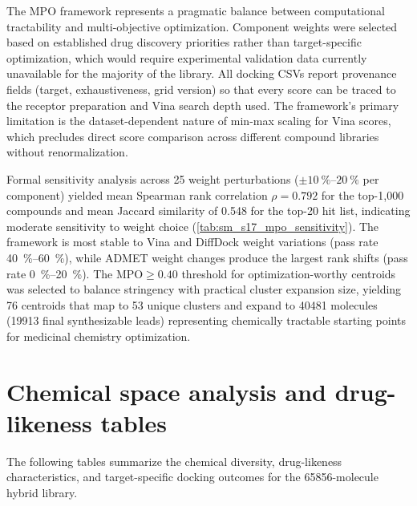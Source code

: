\documentclass[journal=jcisd8,manuscript=suppinfo]{achemso}
\begin{document}
The MPO framework represents a pragmatic balance between computational tractability and multi-objective optimization. Component weights were selected based on established drug discovery priorities \cite{Hughes2008, Lipinski2004} rather than target-specific optimization, which would require experimental validation data currently unavailable for the majority of the library. All docking CSVs report provenance fields (target, exhaustiveness, grid version) so that every score can be traced to the receptor preparation and Vina search depth used. The framework's primary limitation is the dataset-dependent nature of min-max scaling for Vina scores, which precludes direct score comparison across different compound libraries without renormalization.

Formal sensitivity analysis across \num{25} weight perturbations ($\pm \qtyrange{10}{20}{\percent}$ per component) yielded mean Spearman rank correlation $\rho = \num{0.792}$ for the top-1,000 compounds and mean Jaccard similarity of \num{0.548} for the top-20 hit list, indicating moderate sensitivity to weight choice (\cref{tab:sm_s17_mpo_sensitivity}). The framework is most stable to Vina and DiffDock weight variations (pass rate \qtyrange{40}{60}{\percent}), while ADMET weight changes produce the largest rank shifts (pass rate \qtyrange{0}{20}{\percent}). The $\text{MPO} \geq \num{0.40}$ threshold for optimization-worthy centroids was selected to balance stringency with practical cluster expansion size, yielding \num{76} centroids that map to \num{53} unique clusters and expand to \num{40481} molecules (\num{19913} final synthesizable leads) representing chemically tractable starting points for medicinal chemistry optimization.

\clearpage

\section*{Chemical space analysis and drug-likeness tables}

The following tables summarize the chemical diversity, drug-likeness characteristics, and target-specific docking outcomes for the \num{65856}-molecule hybrid library.
\end{document}
